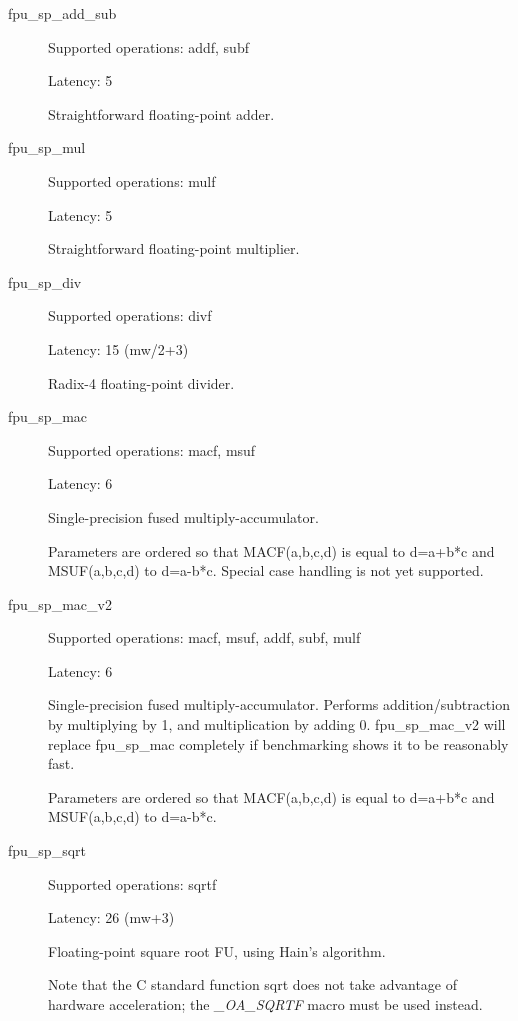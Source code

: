 \documentclass[a4paper,twoside]{tceusermanual}
\begin{document}
\begin{description}
 \item[fpu\_sp\_add\_sub]

Supported operations: addf, subf

Latency: 5

Straightforward floating-point adder.

 \item[fpu\_sp\_mul]

Supported operations:         mulf

Latency:             5

Straightforward floating-point multiplier.

\item[fpu\_sp\_div]

Supported operations:         divf

Latency:             15 (mw/2+3)

Radix-4 floating-point divider.

\item[fpu\_sp\_mac]

Supported operations:         macf, msuf

Latency:             6

Single-precision fused multiply-accumulator.

Parameters are ordered so that MACF(a,b,c,d) is equal to d=a+b*c and MSUF(a,b,c,d) to d=a-b*c. Special case handling is not yet supported.

\item[fpu\_sp\_mac\_v2]

Supported operations:         macf, msuf, addf, subf, mulf

Latency:             6

Single-precision fused multiply-accumulator. Performs addition/subtraction by multiplying by 1,
and multiplication by adding 0. fpu\_sp\_mac\_v2 will replace fpu\_sp\_mac completely if benchmarking shows it
to be reasonably fast.

Parameters are ordered so that MACF(a,b,c,d) is equal to d=a+b*c and MSUF(a,b,c,d) to d=a-b*c.

\item[fpu\_sp\_sqrt]

Supported operations:         sqrtf

Latency:             26 (mw+3)

Floating-point square root FU, using Hain's algorithm.

Note that the C standard function sqrt does not take advantage of hardware acceleration; the
\emph{\_OA\_SQRTF} macro must be used instead.


\end{description}
\end{document}
